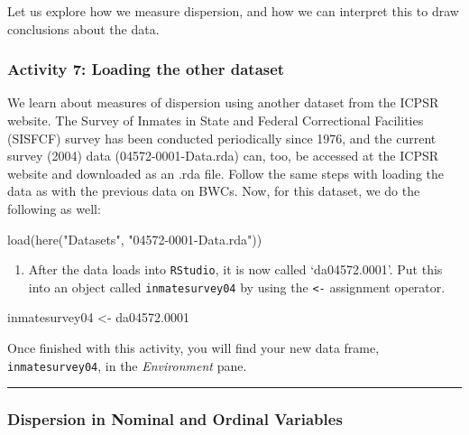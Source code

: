 \documentclass[
]{book}
\newenvironment{Shaded}{\begin{snugshade}}{\end{snugshade}}
\newcommand{\FloatTok}[1]{\textcolor[rgb]{0.00,0.00,0.81}{#1}}
\newcommand{\FunctionTok}[1]{\textcolor[rgb]{0.00,0.00,0.00}{#1}}
\newcommand{\NormalTok}[1]{#1}
\newcommand{\OtherTok}[1]{\textcolor[rgb]{0.56,0.35,0.01}{#1}}
\newcommand{\StringTok}[1]{\textcolor[rgb]{0.31,0.60,0.02}{#1}}
\providecommand{\tightlist}{%
  \setlength{\itemsep}{0pt}\setlength{\parskip}{0pt}}
\begin{document}
Let us explore how we measure dispersion, and how we can interpret this to draw conclusions about the data.

\hypertarget{activity-7-loading-the-other-dataset}{%
\subsubsection{Activity 7: Loading the other dataset}\label{activity-7-loading-the-other-dataset}}

We learn about measures of dispersion using another dataset from the ICPSR website. The Survey of Inmates in State and Federal Correctional Facilities (SISFCF) survey has been conducted periodically since 1976, and the current survey (2004) data (04572-0001-Data.rda) can, too, be accessed at the ICPSR website and downloaded as an .rda file. Follow the same steps with loading the data as with the previous data on BWCs. Now, for this dataset, we do the following as well:

\begin{Shaded}
\begin{Highlighting}[]
\FunctionTok{load}\NormalTok{(}\FunctionTok{here}\NormalTok{(}\StringTok{"Datasets"}\NormalTok{, }\StringTok{"04572{-}0001{-}Data.rda"}\NormalTok{))}
\end{Highlighting}
\end{Shaded}

\begin{enumerate}
\def\labelenumi{\arabic{enumi}.}
\tightlist
\item
  After the data loads into \texttt{RStudio}, it is now called `da04572.0001'. Put this into an object called \texttt{inmatesurvey04} by using the \texttt{\textless{}-} assignment operator.
\end{enumerate}

\begin{Shaded}
\begin{Highlighting}[]
\NormalTok{inmatesurvey04 }\OtherTok{\textless{}{-}}\NormalTok{ da04572}\FloatTok{.0001}
\end{Highlighting}
\end{Shaded}

Once finished with this activity, you will find your new data frame, \texttt{inmatesurvey04}, in the \emph{Environment} pane.

\begin{center}\rule{0.5\linewidth}{0.5pt}\end{center}

\hypertarget{dispersion-in-nominal-and-ordinal-variables}{%
\subsubsection{\texorpdfstring{\textbf{Dispersion in Nominal and Ordinal Variables}}{Dispersion in Nominal and Ordinal Variables}}\label{dispersion-in-nominal-and-ordinal-variables}}
\end{document}
